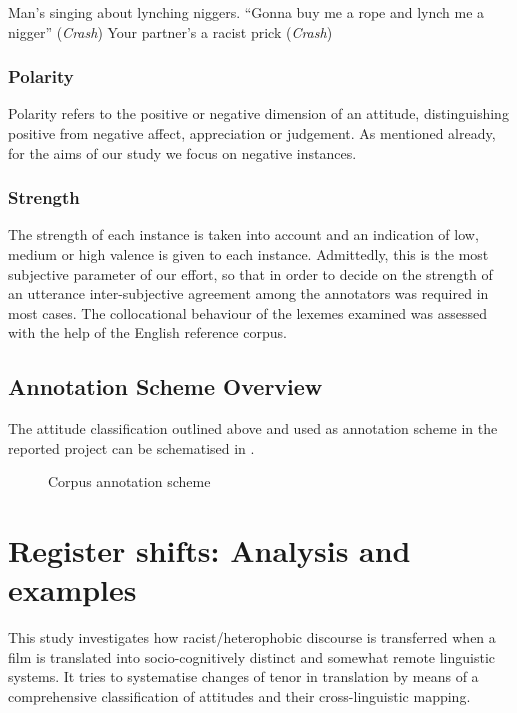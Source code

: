 \documentclass[output=paper]{LSP/langsci}
\begin{document}
\ea \label{ex:2:19} Man's singing about lynching niggers. “Gonna buy me a rope and lynch me a nigger” (\textit{Crash})
\z
\ea \label{ex:2:20} Your partner's a racist prick (\textit{Crash})
\z

\subsubsection{Polarity}
Polarity refers to the positive or negative dimension of an attitude, distinguishing positive from negative affect, appreciation or judgement. As mentioned already, for the aims of our study we focus on negative instances.

\subsubsection{Strength} 
The strength of each instance is taken into account and an indication of low, medium or high valence is given to each instance. Admittedly, this is the most subjective parameter of our effort, so that in order to decide on the strength of an utterance inter-subjective agreement among the annotators was required in most cases. The collocational behaviour of the lexemes examined was assessed with the help of the English reference corpus.

\subsection{Annotation Scheme Overview} \label{sec:2:4:4}
The attitude classification outlined above and used as annotation scheme in the reported project can be schematised in .

\begin{figure}

\caption{Corpus annotation scheme} \label{fig:2:4} 
\end{figure}

\section{Register shifts: Analysis and examples} \label{sec:2:5}

This study investigates how racist/heterophobic discourse is transferred when a film is translated into socio-cognitively distinct and somewhat remote linguistic systems. It tries to systematise changes of tenor \citep{Halliday1978} in translation by means of a comprehensive classification of attitudes and their cross-linguistic mapping.
\end{document}
